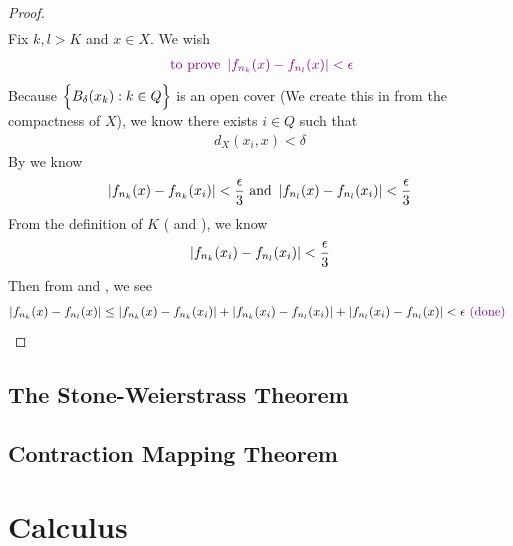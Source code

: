 \documentclass{report}
\begin{document}
\begin{proof}
\begin{align}
\end{align}
Fix $k,l>K$ and $x \in X$. We wish 
\begin{align*}
\textcolor{violet}{\text{ to prove }\left|f_{n_k}(x)-f_{n_l}(x)\right|<\epsilon }
\end{align*}
Because $\Big\{ B_{\delta}(x_k):k \in Q \Big\}$ is an open cover (We create this in  from the compactness of $X$), we know there exists $i\in Q$ such that 
\begin{align*}
d_X(x_i,x)<\delta
\end{align*}
By  we know 
\begin{align}
\label{A6}
\left|f_{n_k}(x)-f_{n_k}(x_i)\right|<\frac{\epsilon}{3}\text{ and }\left|f_{n_l}(x)-f_{n_l}(x_i)\right|<\frac{\epsilon}{3}
\end{align}
From the definition of $K$ ( and ), we know 
\begin{align}
\label{A7}
\left|f_{n_k}(x_i)-f_{n_l}(x_i)\right|<\frac{\epsilon}{3}
\end{align}
Then from  and , we see 
\begin{align*}
\left|f_{n_k}(x)-f_{n_l}(x)\right|\leq \left|f_{n_k}(x)-f_{n_k}(x_i)\right|+\left|f_{n_k}(x_i)-f_{n_l}(x_i)\right|+\left|f_{n_l}(x_i)-f_{n_l}(x)\right|<\epsilon \textcolor{violet}{\text{ (done) }}
\end{align*}


 
\end{proof} 
\section{The Stone-Weierstrass Theorem}
\section{Contraction Mapping Theorem}
\chapter{Calculus}
\end{document}
